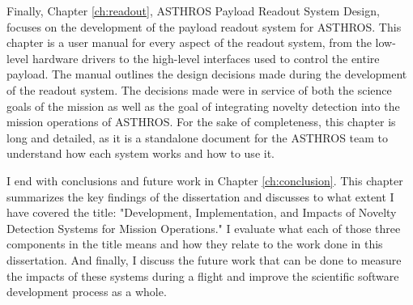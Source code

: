 Finally, Chapter \ref{ch:readout}, ASTHROS Payload Readout System Design, focuses on the development of the payload readout system for ASTHROS.
This chapter is a user manual for every aspect of the readout system, from the low-level hardware drivers to the high-level interfaces used to control the entire payload.
The manual outlines the design decisions made during the development of the readout system.
The decisions made were in service of both the science goals of the mission as well as the goal of integrating novelty detection into the mission operations of ASTHROS.
For the sake of completeness, this chapter is long and detailed, as it is a standalone document for the ASTHROS team to understand how each system works and how to use it.

I end with conclusions and future work in Chapter \ref{ch:conclusion}.
This chapter summarizes the key findings of the dissertation and discusses to what extent I have covered the title: "Development, Implementation, and Impacts of Novelty Detection Systems for Mission Operations."
I evaluate what each of those three components in the title means and how they relate to the work done in this dissertation.
And finally, I discuss the future work that can be done to measure the impacts of these systems during a flight and improve the scientific software development process as a whole.